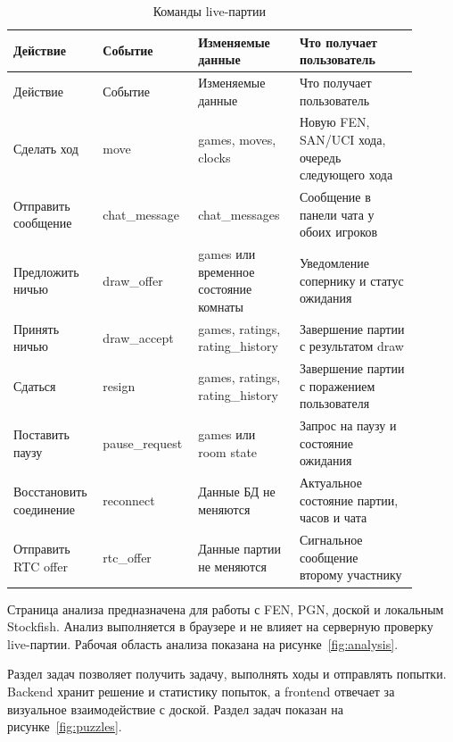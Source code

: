 \noindent\scriptsize
\setlength{\tabcolsep}{3pt}
\renewcommand{\arraystretch}{1.16}
\begin{longtable}{|>{\RaggedRight\arraybackslash}p{0.18\linewidth}|>{\RaggedRight\arraybackslash}p{0.20\linewidth}|>{\RaggedRight\arraybackslash}p{0.24\linewidth}|>{\RaggedRight\arraybackslash}p{0.28\linewidth}|}
\caption{Команды live-партии}\label{tab:live-game-commands}\\
\hline
Действие & Событие & Изменяемые данные & Что получает пользователь\\ \hline
\endfirsthead
\hline
Действие & Событие & Изменяемые данные & Что получает пользователь\\ \hline
\endhead
Сделать ход & move & games, moves, clocks & Новую FEN, SAN/UCI хода, очередь следующего хода\\ \hline
Отправить сообщение & chat_message & chat_messages & Сообщение в панели чата у обоих игроков\\ \hline
Предложить ничью & draw_offer & games или временное состояние комнаты & Уведомление сопернику и статус ожидания\\ \hline
Принять ничью & draw_accept & games, ratings, rating_history & Завершение партии с результатом draw\\ \hline
Сдаться & resign & games, ratings, rating_history & Завершение партии с поражением пользователя\\ \hline
Поставить паузу & pause_request & games или room state & Запрос на паузу и состояние ожидания\\ \hline
Восстановить соединение & reconnect & Данные БД не меняются & Актуальное состояние партии, часов и чата\\ \hline
Отправить RTC offer & rtc_offer & Данные партии не меняются & Сигнальное сообщение второму участнику\\ \hline
\end{longtable}
\normalsize

Страница анализа предназначена для работы с FEN, PGN, доской и локальным Stockfish. Анализ выполняется в браузере и не влияет на серверную проверку live-партии. Рабочая область анализа показана на рисунке~\ref{fig:analysis}.


Раздел задач позволяет получить задачу, выполнять ходы и отправлять попытки. Backend хранит решение и статистику попыток, а frontend отвечает за визуальное взаимодействие с доской. Раздел задач показан на рисунке~\ref{fig:puzzles}.

